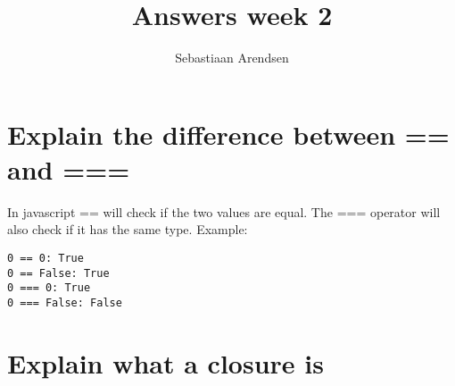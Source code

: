\documentclass[a4paper]{scrartcl}
\title{Answers week 2}
\author{Sebastiaan Arendsen}
\begin{document}
\maketitle

\section{Explain the difference between == and ===}
In javascript == will check if the two values are equal. The === operator will also check if it has the same type. Example:

\begin{lstlisting}
0 == 0: True
0 == False: True
0 === 0: True
0 === False: False
\end{lstlisting}

\section{Explain what a closure is}
\end{document}
